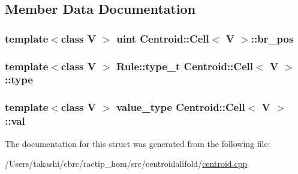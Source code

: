 \subsection{Member Data Documentation}
\hypertarget{struct_centroid_1_1_cell_affe918e74597921889f056a4566ee9d6}{
\subsubsection[{br\+\_\+pos}]{\setlength{\rightskip}{0pt plus 5cm}template$<$class V $>$ {\bf uint} {\bf Centroid\+::\+Cell}$<$ V $>$\+::br\+\_\+pos}}\label{struct_centroid_1_1_cell_affe918e74597921889f056a4566ee9d6}
\hypertarget{struct_centroid_1_1_cell_a6d7372093392e6fcbb30e071b97ba2d8}{
\subsubsection[{type}]{\setlength{\rightskip}{0pt plus 5cm}template$<$class V $>$ {\bf Rule\+::type\+\_\+t} {\bf Centroid\+::\+Cell}$<$ V $>$\+::type}}\label{struct_centroid_1_1_cell_a6d7372093392e6fcbb30e071b97ba2d8}
\hypertarget{struct_centroid_1_1_cell_ab9c512795d366466b23ea0e0c84535aa}{
\subsubsection[{val}]{\setlength{\rightskip}{0pt plus 5cm}template$<$class V $>$ {\bf value\+\_\+type} {\bf Centroid\+::\+Cell}$<$ V $>$\+::val}}\label{struct_centroid_1_1_cell_ab9c512795d366466b23ea0e0c84535aa}


The documentation for this struct was generated from the following file\+:\begin{DoxyCompactItemize}
\item 
/\+Users/takashi/cbrc/ractip\+\_\+hom/src/centroidalifold/\hyperlink{centroid_8cpp}{centroid.\+cpp}\end{DoxyCompactItemize}
